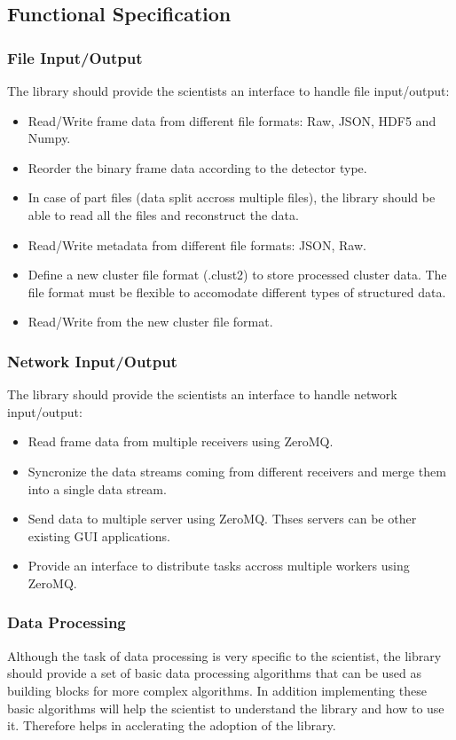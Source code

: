 \begin{spacing}{1.2}
    \subsection{Functional Specification}
    \subsubsection{File Input/Output}
    The library should provide the scientists an interface to handle file input/output:
    \begin{itemize}
        \item Read/Write frame data from different file formats: Raw, JSON, HDF5 and Numpy.
        \item Reorder the binary frame data according to the detector type.
        \item In case of part files (data split accross multiple files), the library should be able to read all the files and reconstruct the data.
        \item Read/Write metadata from different file formats: JSON, Raw.
        \item Define a new cluster file format (.clust2) to store processed cluster data. The file format must
              be flexible to accomodate different types of structured data.
        \item Read/Write from the new cluster file format.
    \end{itemize}

    \subsubsection{Network Input/Output}
    The library should provide the scientists an interface to handle network input/output:
    \begin{itemize}
        \item Read frame data from multiple receivers using ZeroMQ. \cite{hintjens2013zeromq}
        \item Syncronize the data streams coming from different receivers and merge them into a single data stream.
        \item Send data to multiple server using ZeroMQ. Thses servers can be other existing GUI applications.
        \item Provide an interface to distribute tasks accross multiple workers using ZeroMQ.
    \end{itemize}

    \subsubsection{Data Processing}
    Although the task of data processing is very specific to the scientist, the library should provide a set of
    basic data processing algorithms that can be used as building blocks for more complex algorithms.
    In addition implementing these basic algorithms will help the scientist to understand the library and how to use it.
    Therefore helps in acclerating the adoption of the library.


\end{spacing}
